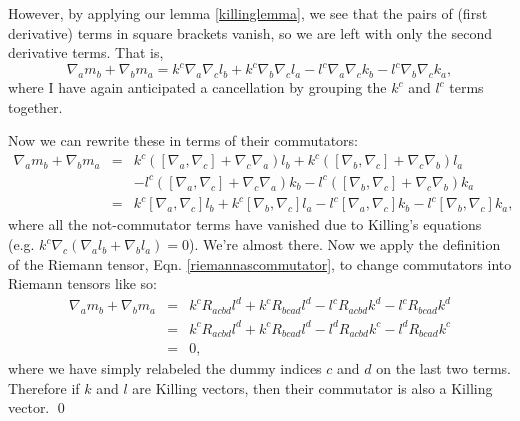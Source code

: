 However, by applying our lemma \ref{killinglemma}, we see that the pairs of (first derivative) terms in square brackets vanish, so we are left with only the second derivative terms. That is,
$$\nabla_a m_b + \nabla_b m_a =k^c \nabla_a \nabla_c l_b + k^c \nabla_b \nabla_c l_a- l^c \nabla_a \nabla_c k_b  - l^c \nabla_b \nabla_c k_a,$$
where I have again anticipated a cancellation by grouping the $k^c$ and $l^c$ terms together.

Now we can rewrite these in terms of their commutators:
\begin{eqnarray*}
\nabla_a m_b + \nabla_b m_a &=&k^c ([\nabla_a,\nabla_c]+\nabla_c\nabla_a) l_b + k^c ([\nabla_b,\nabla_c]+\nabla_c\nabla_b) l_a\\
&&- l^c ([\nabla_a,\nabla_c]+\nabla_c\nabla_a) k_b  - l^c ([\nabla_b,\nabla_c]+\nabla_c\nabla_b) k_a\\
&=& k^c [\nabla_a,\nabla_c] l_b + k^c [\nabla_b,\nabla_c]l_a - l^c [\nabla_a,\nabla_c]k_b  - l^c [\nabla_b,\nabla_c]k_a,
\end{eqnarray*}
where all the not-commutator terms have vanished due to Killing's equations (e.g. $k^c \nabla_c (\nabla_a l_b + \nabla_b l_a)=0$). We're almost there. Now we apply the definition of the Riemann tensor, Eqn. \ref{riemannascommutator}, to change commutators into Riemann tensors like so:
\begin{eqnarray*}
\nabla_a m_b + \nabla_b m_a &=& k^c R_{acbd} l^d + k^c R_{bcad} l^d -l^c R_{acbd} k^d -l^c R_{bcad} k^d\\
&=& k^c R_{acbd} l^d + k^c R_{bcad} l^d -l^d R_{acbd} k^c -l^d R_{bcad} k^c\\
&=&0,
\end{eqnarray*}
where we have simply relabeled the dummy indices $c$ and $d$ on the last two terms. Therefore if $k$ and $l$ are Killing vectors, then their commutator is also a Killing vector. \qed